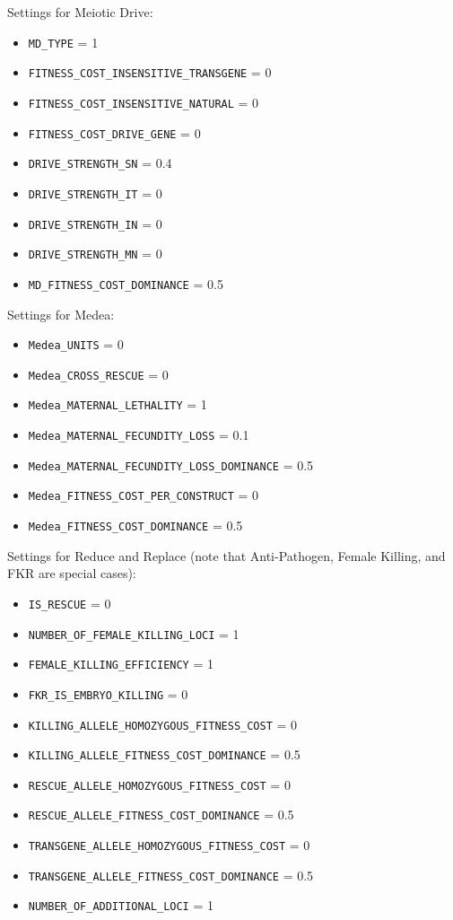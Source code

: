 \documentclass[11pt]{article}
\newcommand{\linecmd}[1]{\texttt{#1}}
\begin{document}
Settings for Meiotic Drive:
\begin{itemize}
	\item \linecmd{MD\_TYPE} = 1
	\item \linecmd{FITNESS\_COST\_INSENSITIVE\_TRANSGENE} = 0
	\item \linecmd{FITNESS\_COST\_INSENSITIVE\_NATURAL} = 0
	\item \linecmd{FITNESS\_COST\_DRIVE\_GENE} = 0
	\item \linecmd{DRIVE\_STRENGTH\_SN} = 0.4
	\item \linecmd{DRIVE\_STRENGTH\_IT} = 0
	\item \linecmd{DRIVE\_STRENGTH\_IN} = 0
	\item \linecmd{DRIVE\_STRENGTH\_MN} = 0
	\item \linecmd{MD\_FITNESS\_COST\_DOMINANCE} = 0.5
\end{itemize}

Settings for Medea:
\begin{itemize}
	\item \linecmd{Medea\_UNITS} = 0
	\item \linecmd{Medea\_CROSS\_RESCUE} = 0
	\item \linecmd{Medea\_MATERNAL\_LETHALITY} = 1
	\item \linecmd{Medea\_MATERNAL\_FECUNDITY\_LOSS} = 0.1
	\item \linecmd{Medea\_MATERNAL\_FECUNDITY\_LOSS\_DOMINANCE} = 0.5
	\item \linecmd{Medea\_FITNESS\_COST\_PER\_CONSTRUCT} = 0
	\item \linecmd{Medea\_FITNESS\_COST\_DOMINANCE} = 0.5
\end{itemize}

Settings for Reduce and Replace (note that Anti-Pathogen, Female Killing, and FKR are special cases):%
\begin{itemize}
	\item \linecmd{IS\_RESCUE} = 0
	\item \linecmd{NUMBER\_OF\_FEMALE\_KILLING\_LOCI} = 1
	\item \linecmd{FEMALE\_KILLING\_EFFICIENCY} = 1
	\item \linecmd{FKR\_IS\_EMBRYO\_KILLING} = 0
	\item \linecmd{KILLING\_ALLELE\_HOMOZYGOUS\_FITNESS\_COST} = 0
	\item \linecmd{KILLING\_ALLELE\_FITNESS\_COST\_DOMINANCE} = 0.5
	\item \linecmd{RESCUE\_ALLELE\_HOMOZYGOUS\_FITNESS\_COST} = 0
	\item \linecmd{RESCUE\_ALLELE\_FITNESS\_COST\_DOMINANCE} = 0.5
	\item \linecmd{TRANSGENE\_ALLELE\_HOMOZYGOUS\_FITNESS\_COST} = 0
	\item \linecmd{TRANSGENE\_ALLELE\_FITNESS\_COST\_DOMINANCE} = 0.5
	\item \linecmd{NUMBER\_OF\_ADDITIONAL\_LOCI} = 1
\end{itemize}
\end{document}
